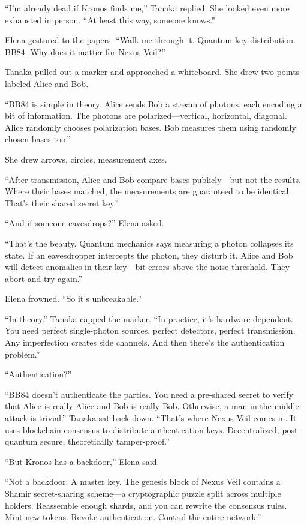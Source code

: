 \documentclass[12pt,oneside]{book}
\begin{document}
``I'm already dead if Kronos finds me,'' Tanaka replied. She looked even more exhausted in person. ``At least this way, someone knows.''

Elena gestured to the papers. ``Walk me through it. Quantum key distribution. BB84. Why does it matter for Nexus Veil?''

Tanaka pulled out a marker and approached a whiteboard. She drew two points labeled Alice and Bob.

``BB84 is simple in theory. Alice sends Bob a stream of photons, each encoding a bit of information. The photons are polarized—vertical, horizontal, diagonal. Alice randomly chooses polarization bases. Bob measures them using randomly chosen bases too.''

She drew arrows, circles, measurement axes.

``After transmission, Alice and Bob compare bases publicly—but not the results. Where their bases matched, the measurements are guaranteed to be identical. That's their shared secret key.''

``And if someone eavesdrops?'' Elena asked.

``That's the beauty. Quantum mechanics says measuring a photon collapses its state. If an eavesdropper intercepts the photon, they disturb it. Alice and Bob will detect anomalies in their key—bit errors above the noise threshold. They abort and try again.''

Elena frowned. ``So it's unbreakable.''

``In theory.'' Tanaka capped the marker. ``In practice, it's hardware-dependent. You need perfect single-photon sources, perfect detectors, perfect transmission. Any imperfection creates side channels. And then there's the authentication problem.''

``Authentication?''

``BB84 doesn't authenticate the parties. You need a pre-shared secret to verify that Alice is really Alice and Bob is really Bob. Otherwise, a man-in-the-middle attack is trivial.'' Tanaka sat back down. ``That's where Nexus Veil comes in. It uses blockchain consensus to distribute authentication keys. Decentralized, post-quantum secure, theoretically tamper-proof.''

``But Kronos has a backdoor,'' Elena said.

``Not a backdoor. A master key. The genesis block of Nexus Veil contains a Shamir secret-sharing scheme—a cryptographic puzzle split across multiple holders. Reassemble enough shards, and you can rewrite the consensus rules. Mint new tokens. Revoke authentication. Control the entire network.''
\end{document}
